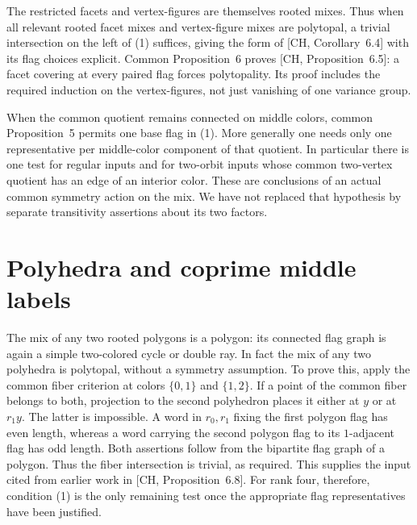 \documentclass[a4paper,11pt]{article}
\begin{document}
The restricted facets and vertex-figures are themselves rooted mixes.
Thus when all relevant rooted facet mixes and vertex-figure mixes are
polytopal, a trivial intersection on the left of (1) suffices, giving
the form of [CH, Corollary~6.4] with its flag choices explicit.
Common Proposition~6 proves [CH, Proposition~6.5]: a facet covering
at every paired flag forces polytopality. Its proof includes the required
induction on the vertex-figures, not just vanishing of one variance group.

When the common quotient remains connected on middle colors, common
Proposition~5 permits one base flag in (1). More generally one needs only
one representative per middle-color component of that quotient. In
particular there is one test for regular inputs and for two-orbit inputs
whose common two-vertex quotient has an edge of an interior color.
These are conclusions of an actual common symmetry action on the mix.
We have not replaced that hypothesis by separate transitivity assertions
about its two factors.



\section{Polyhedra and coprime middle labels}
The mix of any two rooted polygons is a polygon: its connected flag graph
is again a simple two-colored cycle or double ray. In fact the mix of any
two polyhedra is polytopal, without a symmetry assumption. To prove this,
apply the common fiber criterion at colors $\{0,1\}$ and $\{1,2\}$.
If a point of the common fiber belongs to both, projection to the second
polyhedron places it either at $y$ or at $r_1y$. The latter is impossible.
A word in $r_0,r_1$ fixing the first polygon flag has even length, whereas
a word carrying the second polygon flag to its $1$-adjacent flag has odd
length. Both assertions follow from the bipartite flag graph of a
polygon. Thus the fiber intersection is trivial, as required. This
supplies the input cited from earlier work in [CH, Proposition~6.8].
For rank four, therefore, condition (1) is the only remaining test once
the appropriate flag representatives have been justified.
\end{document}
